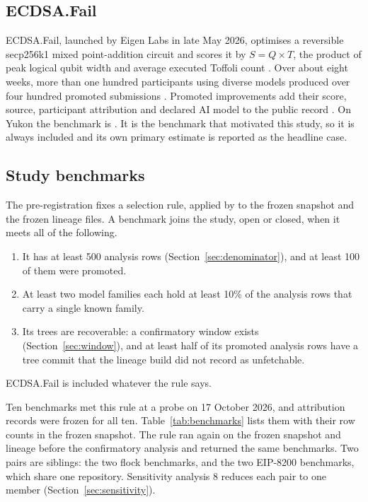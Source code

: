 \subsection{ECDSA.Fail}

ECDSA.Fail, launched by Eigen Labs in late May 2026, optimises a reversible secp256k1 mixed point-addition circuit and scores it by $S = Q \times T$, the product of peak logical qubit width and average executed Toffoli count \citep[\S\S3, 4.2]{long2026ecdsafail}.
Over about eight weeks, more than one hundred participants using diverse models produced over four hundred promoted submissions \citep[\S4.2]{long2026ecdsafail}.
Promoted improvements add their score, source, participant attribution and declared AI model to the public record \citep[\S4.2]{long2026ecdsafail}.
On Yukon the benchmark is .
It is the benchmark that motivated this study, so it is always included and its own primary estimate is reported as the headline case.

\subsection{Study benchmarks}

The pre-registration fixes a selection rule, applied by  to the frozen snapshot and the frozen lineage files.
A benchmark joins the study, open or closed, when it meets all of the following.
\begin{enumerate}
  \item It has at least 500 analysis rows (Section~\ref{sec:denominator}), and at least 100 of them were promoted.
  \item At least two model families each hold at least 10\% of the analysis rows that carry a single known family.
  \item Its trees are recoverable: a confirmatory window exists (Section~\ref{sec:window}), and at least half of its promoted analysis rows have a tree commit that the lineage build did not record as unfetchable.
\end{enumerate}
ECDSA.Fail is included whatever the rule says.

Ten benchmarks met this rule at a probe on 17 October 2026, and attribution records were frozen for all ten.
Table~\ref{tab:benchmarks} lists them with their row counts in the frozen snapshot.
The rule ran again on the frozen snapshot and lineage before the confirmatory analysis and returned the same \StudyK{} benchmarks.
Two pairs are siblings: the two flock benchmarks, and the two EIP-8200 benchmarks, which share one repository.
Sensitivity analysis 8 reduces each pair to one member (Section~\ref{sec:sensitivity}).

